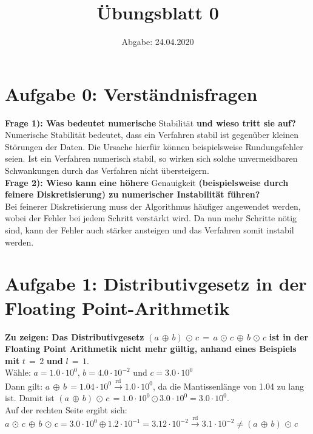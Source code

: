 

\subject{Computational Physics}
\title{Übungsblatt 0}
\date{%
  Abgabe: 24.04.2020
}



\maketitle
\thispagestyle{empty}
\newpage

\section*{Aufgabe 0: Verständnisfragen}

\textbf{Frage 1): Was bedeutet numerische} Stabilität \textbf{und wieso tritt sie auf?}\\
Numerische Stabilität bedeutet, dass ein Verfahren stabil ist gegenüber kleinen Störungen der Daten. Die Ursache hierfür können beispielsweise Rundungsfehler seien. Ist ein Verfahren numerisch stabil, so wirken sich solche unvermeidbaren
Schwankungen durch das Verfahren nicht übersteigern. \\
\textbf{Frage 2): Wieso kann eine höhere} Genauigkeit \textbf{(beispielsweise durch feinere Diskretisierung) zu numerischer Instabilität führen?}\\
Bei feinerer Diskretisierung muss der Algorithmus häufiger angewendet werden, wobei der Fehler bei jedem Schritt verstärkt wird. Da nun mehr Schritte nötig sind, kann der Fehler auch stärker ansteigen und das Verfahren somit instabil werden.


\section*{Aufgabe 1: Distributivgesetz in der Floating Point-Arithmetik}
\textbf{Zu zeigen: Das Distributivgesetz }$(a\,\oplus\,b)\,\odot\,c\,=\,a\,\odot\,c\,\oplus\,b\,\odot\,c$\textbf{ ist in der Floating Point Arithmetik nicht mehr gültig, anhand eines Beispiels mit }$t\,=\,2$\textbf{ und }$l\,=\,1$.\\
Wähle: $a=1.0\cdot10^0$, $b=4.0\cdot10^{-2}$ und $c=3.0\cdot10^{0}$ \\
Dann gilt: $a\,\oplus\,b\,=1.04\cdot10^0\overset{\text{rd}}{\to}1.0\cdot10^0$, da die Mantissenlänge von 1.04 zu lang ist.
Damit ist $(a\,\oplus\,b)\,\odot\,c\,=1.0\cdot10^0\odot3.0\cdot10^0=3.0\cdot10^0$.\\
Auf der rechten Seite ergibt sich:\\$a\,\odot\,c\,\oplus\,b\,\odot\,c=3.0\cdot10^0\oplus1.2\cdot
10^{-1}=3.12\cdot10^{-2}\overset{\text{rd}}{\to}3.1\cdot10^{-2}\neq(a\,\oplus\,b)\,\odot\,c$

